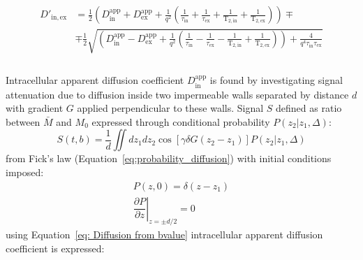 \begin{equation}\label{eq: Karger ADC}
\begin{split}
D'_\mathrm{in,ex} &= \frac{1}{2}\left( D^{\mathrm{app}}_\mathrm{in} + D^{\mathrm{app}}_\mathrm{ex} + \frac{1}{q^2}\left(\frac{1}{\tau_{\mathrm{in}}} + \frac{1}{\tau_{\mathrm{ex}}} + \frac{1}{\mathrm{T}_{2,\mathrm{in}}} + \frac{1}{\mathrm{T}_{2,\mathrm{ex}}} \right) \right) \mp \\ &\mp \frac{1}{2}\sqrt{\left( D^{\mathrm{app}}_\mathrm{in} - D^{\mathrm{app}}_\mathrm{ex} + \frac{1}{q^2}\left(\frac{1}{\tau_{\mathrm{in}}} - \frac{1}{\tau_{\mathrm{ex}}} - \frac{1}{\mathrm{T}_{2,\mathrm{in}}} + \frac{1}{\mathrm{T}_{2,\mathrm{ex}}} \right) \right) + \frac{4}{q^4\tau_{\mathrm{in}}\tau_{\mathrm{ex}}}}\\
\end{split}
\end{equation}
\\
Intracellular apparent diffusion coefficient $D^{\mathrm{app}}_\mathrm{in}$ is found by investigating signal attenuation due to diffusion inside two impermeable walls separated by distance $d$ with gradient $G$ applied perpendicular to these walls. 
Signal $S$ defined as ratio between $\bar{M}$ and $M_{0}$ expressed through conditional probability $P(z_2|z_1, \Delta)$:
\begin{equation}\label{eq: Karger AppEx}
S (t,b)= \dfrac{1}{d}\iint dz_1 dz_2  \cos \left[ \gamma \delta G (z_2-z_1)\right]P(z_2|z_1, \Delta)
\end{equation}
from Fick's law (Equation~\ref{eq:probability_diffusion}) with initial conditions imposed:
\begin{equation}\label{eq: probability initial conditions}
\begin{array}{c}
	P\left( z,0\right) = \delta\left( z-z_1\right)\\[10pt]
	\left. \dfrac{\partial P}{\partial z}\right\vert_{z=\pm d/2} = 0
\end{array}
\end{equation}
using Equation~\ref{eq: Diffusion from bvalue} intracellular apparent diffusion coefficient is expressed:
